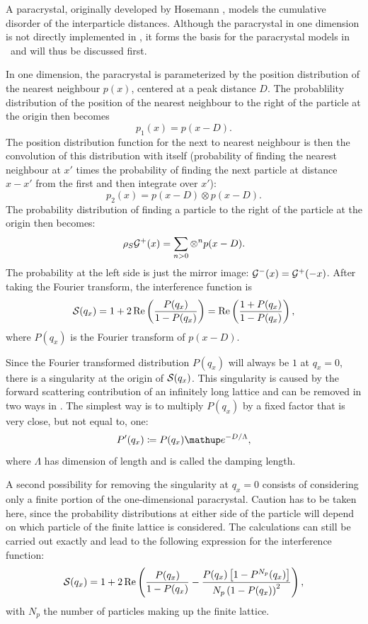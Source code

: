 A paracrystal, originally developed by Hosemann \cite{Hos51},
models the cumulative disorder of the interparticle distances.
Although the paracrystal in one dimension is not directly implemented in \BornAgain,
it forms the basis for the paracrystal models in \BornAgain\ and will thus be discussed first.

In one dimension, the paracrystal is parameterized by the
position distribution of the nearest neighbour $p(x)$, centered at a peak distance $D$.
The probablility
distribution of the position of the nearest neighbour to the right of the particle at the origin then becomes
\begin{equation}
  p_1(x) = p(x-D).
\end{equation}
The position distribution function for the next to nearest neighbour is then the convolution of this distribution with itself
(probability of finding the nearest neighbour at $x'$ times the probability of finding the next particle at distance $x-x'$ from the first and
then integrate over $x'$):
\begin{equation}
  p_2(x) = p(x-D) \otimes p(x-D).
\end{equation}
The probability distribution of finding a particle to the right of the particle at the origin then becomes:
\begin{equation}
  \rho_S \mathcal{G}^+(x) = \sum_{n>0} \otimes^n p(x-D).
\end{equation}
The probability at the left side is just the mirror image: $\mathcal{G}^-(x) = \mathcal{G}^+(-x)$.
After taking the Fourier transform, the interference function is
\begin{equation}
  \mathcal{S}(q_x) = 1 + 2\operatorname{Re}\left(\frac{P(q_x)}{1-P(q_x)}\right) = \operatorname{Re}\left(\frac{1+P(q_x)}{1-P(q_x)}\right),
\end{equation}
where $P(q_x)$ is the Fourier transform of $p(x-D)$.

Since the Fourier transformed distribution $P(q_x)$ will always be $1$ at $q_x=0$, there is a singularity at the origin of $\mathcal{S}(q_x)$.
This singularity is caused by the forward scattering contribution of an infinitely long lattice and can be removed in two ways in \BornAgain.
The simplest way is to multiply $P(q_x)$ by a fixed factor that is very close, but not equal to, one:
\begin{equation}
  P'(q_x) \coloneqq P(q_x) \e^{-D/\Lambda},
\end{equation}
where $\Lambda$ has dimension of length and is called the damping length.

A second possibility for removing the singularity at $q_x=0$ consists of considering only a finite portion of the one-dimensional
paracrystal. Caution has to be taken here, since the probability distributions at either side of the particle will depend on which particle
of the finite lattice is considered. The calculations can still be carried out exactly and lead to the following expression for the
interference function:
\begin{equation}
   \mathcal{S}(q_x) = 1 + 2\operatorname{Re}\left( \frac{P(q_x)}{1-P(q_x)} - \frac{P(q_x)\left[1-P^{N_p}(q_x)\right]}{N_p\left( 1 - P(q_x) \right)^2} \right),
\end{equation}
with $N_p$ the number of particles making up the finite lattice.

